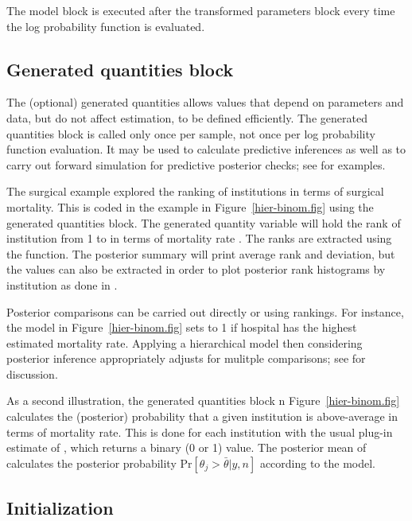 \documentclass[article]{jss}
\begin{document}
The model block is executed after the transformed parameters block
every time the log probability function is evaluated.  

\subsection{Generated quantities block}

The (optional) generated quantities allows values that depend on
parameters and data, but do not affect estimation, to be defined
efficiently.  The generated quantities block is called only once per
sample, not once per log probability function evaluation.  It may be
used to calculate predictive inferences as well as to carry out
forward simulation for predictive posterior checks; see
\citep{GelmanEtAl:2013} for examples.

The  surgical example explored the ranking of
institutions in terms of surgical mortality.  This is coded in the
example in Figure~\ref{hier-binom.fig} using the generated quantities
block.  The generated quantity variable  will hold the
rank of institution  from 1 to  in terms of mortality
rate .  The ranks are extracted using the 
function. The posterior summary will print average rank and deviation,
but the values can also be extracted in order to plot posterior rank
histograms by institution as done in \citep[Examples, Volume
1]{LunnEtAl:2000}.

Posterior comparisons can be carried out directly or using rankings.
For instance, the model in Figure~\ref{hier-binom.fig} sets
 to 1 if hospital  has the highest estimated
mortality rate.  Applying a hierarchical model then considering
posterior inference appropriately adjusts for mulitple comparisons;
see \citep{GelmanEtAl:2012, Efron:2010} for discussion.

As a second illustration, the generated quantities block n
Figure~\ref{hier-binom.fig} calculates the (posterior) probability
that a given institution is above-average in terms of mortality rate.
This is done for each institution  with the usual plug-in
estimate of , which returns a binary (0
or 1) value.  The posterior mean of  calculates
the posterior probability $\mbox{Pr}[\theta_j > \bar{\theta}|y,n]$
according to the model.

\subsection{Initialization}
\end{document}
